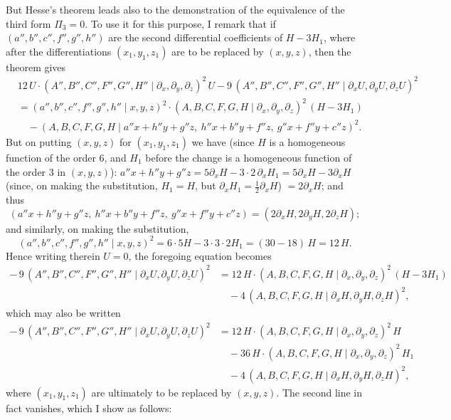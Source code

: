 \documentclass[11pt]{article}
\newcommand{\Cdel}{\mid}
\begin{document}
\medskip

\noindent But Hesse's theorem leads also to the demonstration of the equivalence of the third form $\Pi_3 = 0$. To use it for this purpose, I remark that if $(a'', b'', c'', f'', g'', h'')$ are the second differential coefficients of $H - 3 H_1$, where after the differentiations $(x_1, y_1, z_1)$ are to be replaced by $(x, y, z)$, then the theorem gives
\[
\begin{aligned}
   &12\,U\cdot(A'', B'', C'', F'', G'', H''\Cdel\partial_x,\partial_y,\partial_z)^2\,U - 9\,(A'', B'', C'', F'', G'', H''\Cdel\partial_x U,\partial_y U,\partial_z U)^2\\
   &= (a'', b'', c'', f'', g'', h''\Cdel x, y, z)^2\cdot(A, B, C, F, G, H\Cdel\partial_x,\partial_y,\partial_z)^2\,(H - 3 H_1)\\
   &\quad{} - (A, B, C, F, G, H\Cdel a'' x + h'' y + g'' z,\ h'' x + b'' y + f'' z,\ g'' x + f'' y + c'' z)^2.
\end{aligned}
\]
But on putting $(x, y, z)$ for $(x_1, y_1, z_1)$ we have (since $H$ is a homogeneous function of the order 6, and $H_1$ before the change is a homogeneous function of the order 3 in $(x, y, z)$): $a'' x + h'' y + g'' z = 5\partial_x H - 3\cdot 2\,\partial_x H_1 = 5\partial_x H - 3\partial_x H$ (since, on making the substitution, $H_1 = H$, but $\partial_x H_1 = \tfrac{1}{2}\partial_x H$) $= 2\partial_x H$; and thus
\[
   (a'' x + h'' y + g'' z,\ h'' x + b'' y + f'' z,\ g'' x + f'' y + c'' z) = (2\partial_x H, 2\partial_y H, 2\partial_z H);
\]
and similarly, on making the substitution,
\[
   (a'', b'', c'', f'', g'', h''\Cdel x, y, z)^2 = 6\cdot 5 H - 3\cdot 3\cdot 2 H_1 = (30 - 18)\,H = 12\,H.
\]
Hence writing therein $U = 0$, the foregoing equation becomes
\[
\begin{aligned}
   -\,9\,(A'', B'', C'', F'', G'', H''\Cdel\partial_x U,\partial_y U,\partial_z U)^2 &= 12\,H\cdot(A, B, C, F, G, H\Cdel\partial_x,\partial_y,\partial_z)^2\,(H - 3 H_1)\\
   &\quad{} - 4\,(A, B, C, F, G, H\Cdel\partial_x H,\partial_y H,\partial_z H)^2,
\end{aligned}
\]
which may also be written
\[
\begin{aligned}
   -\,9\,(A'', B'', C'', F'', G'', H''\Cdel\partial_x U,\partial_y U,\partial_z U)^2 &= 12\,H\cdot(A, B, C, F, G, H\Cdel\partial_x,\partial_y,\partial_z)^2\,H\\
   &\quad{} - 36\,H\cdot(A, B, C, F, G, H\Cdel\partial_x,\partial_y,\partial_z)^2\,H_1\\
   &\quad{} - 4\,(A, B, C, F, G, H\Cdel\partial_x H,\partial_y H,\partial_z H)^2,
\end{aligned}
\]
where $(x_1, y_1, z_1)$ are ultimately to be replaced by $(x, y, z)$. The second line in fact vanishes, which I show as follows:
\end{document}
